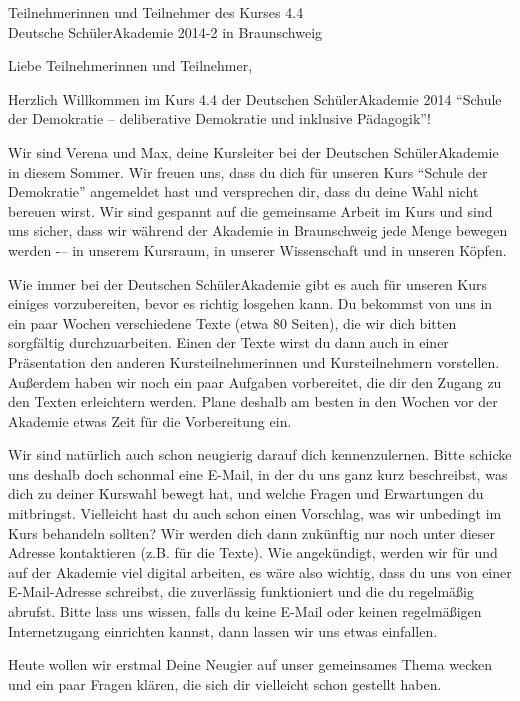 \documentclass[a4paper]{letter}
\date{15.\ April 2014}
\begin{document}
\begin{letter}{
	Teilnehmerinnen und Teilnehmer des Kurses 4.4 \\
	Deutsche SchülerAkademie 2014-2 in Braunschweig}

\opening{Liebe Teilnehmerinnen und Teilnehmer,}

Herzlich Willkommen im Kurs 4.4 der Deutschen SchülerAkademie 2014 ``Schule der Demokratie -- deliberative Demokratie und inklusive Pädagogik''!

Wir sind Verena und Max, deine Kursleiter bei der Deutschen SchülerAkademie in diesem Sommer.
Wir freuen uns, dass du dich für unseren Kurs ``Schule der Demokratie'' angemeldet hast und versprechen dir, dass du deine Wahl nicht bereuen wirst.
Wir sind gespannt auf die gemeinsame Arbeit im Kurs und sind uns sicher, dass wir während der Akademie in Braunschweig jede Menge bewegen werden  -– in unserem Kursraum, in unserer Wissenschaft und in unseren Köpfen.

Wie immer bei der Deutschen SchülerAkademie gibt es auch für unseren Kurs einiges vorzubereiten, bevor es richtig losgehen kann.
Du bekommst von uns in ein paar Wochen verschiedene Texte (etwa 80 Seiten), die wir dich bitten sorgfältig durchzuarbeiten.
Einen der Texte wirst du dann auch in einer Präsentation den anderen Kursteilnehmerinnen und Kursteilnehmern vorstellen.
Außerdem haben wir noch ein paar Aufgaben vorbereitet, die dir den Zugang zu den Texten erleichtern werden.
Plane deshalb am besten in den Wochen vor der Akademie etwas Zeit für die Vorbereitung ein.

Wir sind natürlich auch schon neugierig darauf dich kennenzulernen.
Bitte schicke uns deshalb doch schonmal eine E-Mail, in der du uns ganz kurz beschreibst, was dich zu deiner Kurswahl bewegt hat, und welche Fragen und Erwartungen du mitbringst.
Vielleicht hast du auch schon einen Vorschlag, was wir unbedingt im Kurs behandeln sollten?
Wir werden dich dann zukünftig nur noch unter dieser Adresse kontaktieren (z.B. für die Texte).
Wie angekündigt, werden wir für und auf der Akademie viel digital arbeiten, es wäre also wichtig, dass du uns von einer E-Mail-Adresse schreibst, die zuverlässig funktioniert und die du regelmäßig abrufst.
Bitte lass uns wissen, falls du keine E-Mail oder keinen regelmäßigen Internetzugang einrichten kannst, dann lassen wir uns etwas einfallen.

Heute wollen wir erstmal Deine Neugier auf unser gemeinsames Thema wecken und ein paar Fragen klären, die sich dir vielleicht schon gestellt haben.


\end{letter}
\end{document}
